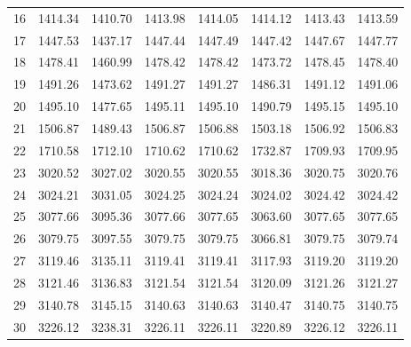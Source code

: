 \documentclass[10pt,oneside]{article}
\begin{document}
\begin{table}[h!]
\begin{tabular}{cccccccc}
16 &   1414.34 & 1410.70 & 1413.98 & 1414.05 &      1414.12 & 1413.43 & 1413.59 \\
17 &   1447.53 & 1437.17 & 1447.44 & 1447.49 &      1447.42 & 1447.67 & 1447.77 \\
18 &   1478.41 & 1460.99 & 1478.42 & 1478.42 &      1473.72 & 1478.45 & 1478.40 \\
19 &   1491.26 & 1473.62 & 1491.27 & 1491.27 &      1486.31 & 1491.12 & 1491.06 \\
20 &   1495.10 & 1477.65 & 1495.11 & 1495.10 &      1490.79 & 1495.15 & 1495.10 \\
21 &   1506.87 & 1489.43 & 1506.87 & 1506.88 &      1503.18 & 1506.92 & 1506.83 \\
22 &   1710.58 & 1712.10 & 1710.62 & 1710.62 &      1732.87 & 1709.93 & 1709.95 \\
23 &   3020.52 & 3027.02 & 3020.55 & 3020.55 &      3018.36 & 3020.75 & 3020.76 \\
24 &   3024.21 & 3031.05 & 3024.25 & 3024.24 &      3024.02 & 3024.42 & 3024.42 \\
25 &   3077.66 & 3095.36 & 3077.66 & 3077.65 &      3063.60 & 3077.65 & 3077.65 \\
26 &   3079.75 & 3097.55 & 3079.75 & 3079.75 &      3066.81 & 3079.75 & 3079.74 \\
27 &   3119.46 & 3135.11 & 3119.41 & 3119.41 &      3117.93 & 3119.20 & 3119.20 \\
28 &   3121.46 & 3136.83 & 3121.54 & 3121.54 &      3120.09 & 3121.26 & 3121.27 \\
29 &   3140.78 & 3145.15 & 3140.63 & 3140.63 &      3140.47 & 3140.75 & 3140.75 \\
30 &   3226.12 & 3238.31 & 3226.11 & 3226.11 &      3220.89 & 3226.12 & 3226.11 \\
\bottomrule
\end{tabular}
\end{table}

\clearpage
\end{document}
